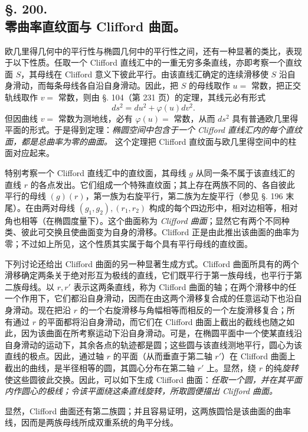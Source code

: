 \subsection*{§. 200.\\ 零曲率直纹面与 Clifford 曲面。}

欧几里得几何中的平行性与椭圆几何中的平行性之间，还有一种显著的类比，表现于以下性质。任取一个 Clifford 直线汇中的一重无穷多条直线，亦即考察一个直纹面 \(S\)，其母线在 Clifford 意义下彼此平行。由该直线汇确定的连续滑移使 \(S\) 沿自身滑动，而每条母线各自沿自身滑动。因此，把 \(S\) 的母线取作 \(u=\) 常数，把正交轨线取作 \(v=\) 常数，则由 §. 104（第 231 页）的定理，其线元必有形式
\[
 ds^2=du^2+\varphi(u)dv^2.
\]
但因曲线 \(v=\) 常数为测地线，必有 \(\varphi(u)=\) 常数，从而 \(ds^2\) 具有普通欧几里得平面的形式。于是得到定理：\emph{椭圆空间中包含于一个 Clifford 直线汇内的每个直纹面，都是总曲率为零的曲面。} 这个定理把 Clifford 直纹面与欧几里得空间中的柱面对应起来。

特别考察一个 Clifford 直线汇中的直纹面，其母线 \(g\) 从同一条不属于该直线汇的直线 \(r\) 的各点发出。它们组成一个特殊直纹面；其上存在两族不同的、各自彼此平行的母线 \((g)(r)\)，第一族为右旋平行，第二族为左旋平行（参见 §. 196 末尾）。在由两对母线 \((g_1,g_2),(r_1,r_2)\) 构成的每个四边形中，相对边相等，相对角也相等（在椭圆度量下）。这个曲面称为 \emph{Clifford 曲面}；显然它有两个不同种类、彼此可交换且使曲面变为自身的滑移。Clifford 正是由此推出该曲面的曲率为零；不过如上所见，这个性质其实属于每个具有平行母线的直纹面。

下列讨论还给出 Clifford 曲面的另一种显著生成方式。Clifford 曲面所具有的两个滑移确定两条关于绝对形互为极线的直线，它们既平行于第一族母线，也平行于第二族母线。以 \(r,r'\) 表示这两条直线，称为 Clifford 曲面的轴；在两个滑移中的任一个作用下，它们都沿自身滑动，因而在由这两个滑移复合成的任意运动下也沿自身滑动。现在把沿 \(r\) 的一个右旋滑移与角幅相等而相反的一个左旋滑移复合；所有通过 \(r\) 的平面都将沿自身滑动，而它们在 Clifford 曲面上截出的截线也随之如此，因为该曲面在所考察运动下沿自身滑动。可是，在椭圆平面中一个使某直线沿自身滑动的运动下，其余各点的轨迹都是圆；这些圆与该直线测地平行，圆心为该直线的极点。因此，通过轴 \(r\) 的平面（从而垂直于第二轴 \(r'\)）在 Clifford 曲面上截出的曲线，是半径相等的圆，其圆心分布在第二轴 \(r'\) 上。显然，绕 \(r\) 的纯\emph{旋转}使这些圆彼此交换。因此，可以如下生成 Clifford 曲面：\emph{任取一个圆，并在其平面内作圆心的极线；令该平面绕这条直线旋转，所取圆便描出 Clifford 曲面。}

显然，Clifford 曲面还有第二族圆；并且容易证明，这两族圆恰是该曲面的曲率线，因而是两族母线所成双重系统的角平分线。

